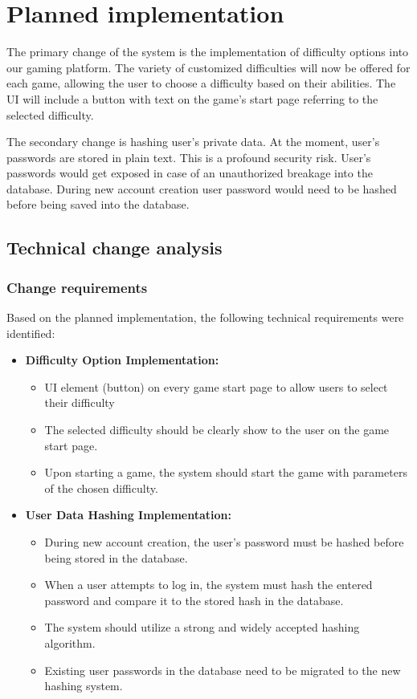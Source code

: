 \documentclass[11pt,a4paper]{article}
\begin{document}
\section{Planned implementation}
The primary change of the system is the implementation of difficulty options into our gaming platform. The variety of customized difficulties will now be offered for each game, allowing the user to choose a difficulty based on their abilities. The UI will include a button with text on the game's start page referring to the selected difficulty. 

The secondary change is hashing user's private data. At the moment, user's passwords are stored in plain text. This is a profound security risk. User's passwords would get exposed in case of an unauthorized breakage into the database. During new account creation user password would need to be hashed before being saved into the database.


\subsection{Technical change analysis}
\subsubsection{Change requirements}
Based on the planned implementation, the following technical requirements were identified:

\begin{itemize}
    \item  \textbf{Difficulty Option Implementation:}
    \begin{itemize}
        \item UI element (button) on every game start page to allow users to select their difficulty
        \item The selected difficulty should be clearly show to the user on the game start page.
        \item Upon starting a game, the system should start the game with parameters of the chosen difficulty.
    \end{itemize}
    \item  \textbf{User Data Hashing Implementation:}
    \begin{itemize}
        \item During new account creation, the user's password must be hashed before being stored in the database.
        \item When a user attempts to log in, the system must hash the entered password and compare it to the stored hash in the database.
        \item The system should utilize a strong and widely accepted hashing algorithm.
        \item Existing user passwords in the database need to be migrated to the new hashing system.
    \end{itemize}
\end{itemize}
\end{document}
